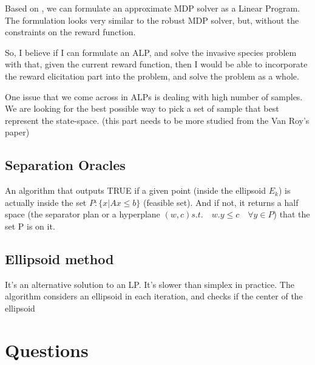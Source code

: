 \documentclass{article}
\theoremstyle{remark}
\theoremstyle{remark}
\theoremstyle{remark}
\theoremstyle{remark}
\theoremstyle{remark}
\theoremstyle{remark}
\begin{document}
Based on \cite{DeFarias2003}, we can formulate an approximate MDP solver as a Linear Program. The formulation looks very similar to the robust MDP solver, but, without the constraints on the reward function.


So, I believe if I can formulate an ALP, and solve the invasive species problem with that, given the current reward function, then I would be able to incorporate the reward elicitation part into the problem, and solve the problem as a whole.

One issue that we come across in ALPs is dealing with high number of samples. We are looking for the best possible way to pick a set of sample that best represent the state-space. (this part needs to be more studied from the Van Roy's paper)


\subsection*{Separation Oracles}

An algorithm that outputs TRUE if a given point (inside the ellipsoid $E_k$) is actually inside the set $P:\{x|Ax \leq b\}$ (feasible set). And if not, it returns a half space (the separator plan or a hyperplane $(w,c) s.t. \quad w.y \leq c \quad \forall y \in P$) that the set P is on it.

\subsection*{Ellipsoid method}

It's an alternative solution to an LP. It's slower than simplex in practice. The algorithm considers an ellipsoid in each iteration, and checks if the center of the ellipsoid 



\section{Questions}





\end{document}
